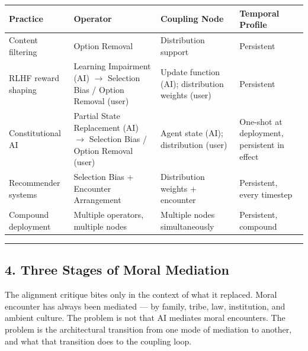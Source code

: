 \documentclass[
]{article}
\newcounter{none} %
\begin{document}
{\def\LTcaptype{none} %
\begin{longtable}[]{@{}
  >{\raggedright\arraybackslash}p{}
  >{\raggedright\arraybackslash}p{}
  >{\raggedright\arraybackslash}p{}
  >{\raggedright\arraybackslash}p{}@{}}
\toprule\noalign{}
\begin{minipage}[b]{\linewidth}\raggedright
Practice
\end{minipage} & \begin{minipage}[b]{\linewidth}\raggedright
Operator
\end{minipage} & \begin{minipage}[b]{\linewidth}\raggedright
Coupling Node
\end{minipage} & \begin{minipage}[b]{\linewidth}\raggedright
Temporal Profile
\end{minipage} \\
\midrule\noalign{}
\endhead
\bottomrule\noalign{}
\endlastfoot
Content filtering & Option Removal & Distribution support &
Persistent \\
RLHF reward shaping & Learning Impairment (AI) \(\to\) Selection Bias /
Option Removal (user) & Update function (AI); distribution weights
(user) & Persistent \\
Constitutional AI & Partial State Replacement (AI) \(\to\) Selection
Bias / Option Removal (user) & Agent state (AI); distribution (user) &
One-shot at deployment, persistent in effect \\
Recommender systems & Selection Bias + Encounter Arrangement &
Distribution weights + encounter & Persistent, every timestep \\
Compound deployment & Multiple operators, multiple nodes & Multiple
nodes simultaneously & Persistent, compound \\
\end{longtable}
}

\begin{center}\rule{0.5\linewidth}{0.5pt}\end{center}

\subsection{4. Three Stages of Moral
Mediation}\label{three-stages-of-moral-mediation}

The alignment critique bites only in the context of what it replaced.
Moral encounter has always been mediated --- by family, tribe, law,
institution, and ambient culture. The problem is not that AI mediates
moral encounters. The problem is the architectural transition from one
mode of mediation to another, and what that transition does to the
coupling loop.
\end{document}
